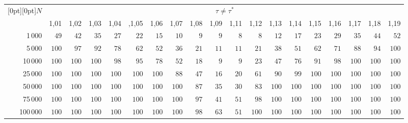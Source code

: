 \begin{table}[b]\small %
\vspace*{-24pt}
\begin{center}
\vspace*{2ex}

\tabcolsep=3.7pt
\begin{tabular}{|r|r|r|r|r|r|r|r|r|r|r|r|r|r|r|r|r|r|r|}
\hline
\multicolumn{1}{|c|}{\raisebox{-6pt}[0pt][0pt]{$N$}}& \multicolumn{18}{c|}{$\tau\neq\tau^*$} \\
\cline{2-19}
& 1,01 & 1,02 & 1,03 & 1,04 & ,1,05 & 1,06 & 1,07 & 1,08 & 1,09
& 1,11 & 1,12 & 1,13 & 1,14 & 1,15 & 1,16 & 1,17 & 1,18 & 1,19 \\ 
\hline
1\,000 & $49$ & $42$ & $35$ & $27$ & $22$ & $15$ & $10$ & $9$ & $9$
& $8$ & $8$ & $12$ & $17$ & $23$ & $29$ & $35$ & $44$ & $52$  \\
5\,000 & $100$ & $97$ & $92$ & $78$ & $62$ & $52$ & $36$ & $21$ & $11$
& $11$ & $21$ & $38$ & $51$ & $62$ & $71$ & $88$ & $94$ & $100$ \\
10\,000 & $100$ & $100$ & $100$ & $98$ & $95$ & $78$ & $52$ & $18$ & $9$
& $9$ & $23$ & $47$ & $76$ & $91$ & $98$ & $100$ & $100$ & $100$ \\
25\,000 & $100$ & $100$ & $100$ & $100$ & $100$ & $100$ & $88$ & $47$ & $16$
& $20$ & $61$ & $90$ & $99$ & $100$ & $100$ & $100$ & $100$ & $100$ \\
50\,000 & $100$ & $100$ & $100$ & $100$ & $100$ & $100$ & $100$ & $87$ & $35$
& $30$ & $83$ & $100$ & $100$ & $100$ & $100$ & $100$ & $100$ & $100$ \\
75\,000 & $100$ & $100$ & $100$ & $100$ & $100$ & $100$ & $100$ & $97$ & $41$
& $51$ & $98$ & $100$ & $100$ & $100$ & $100$ & $100$ & $100$ & $100$ \\
100\,000 & $100$ & $100$ & $100$ & $100$ & $100$ & $100$ & $100$ & $98$ & $63$
& $51$ & $100$ & $100$ & $100$ & $100$ & $100$ & $100$ & $100$ & $100$ \\ \hline
\end{tabular}
\end{center}
\begin{center}
\vspace*{2ex}


\end{center}
\end{table}
